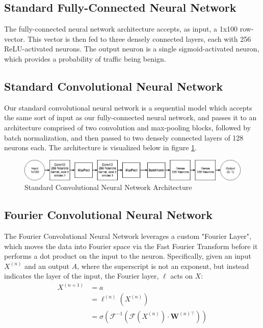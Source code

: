 \documentclass[10pt]{article}
\begin{document}
\subsection{Standard Fully-Connected Neural Network}
The fully-connected neural network architecture accepts, as input, a 1x100 row-vector. 
This vector is then fed to three densely connected layers, each with 256 ReLU-activated neurons.
The output neuron is a single sigmoid-activated neuron, which provides a probability of traffic being benign.

\subsection{Standard Convolutional Neural Network}
Our standard convolutional neural network is a sequential model which accepts the same sort of input as our fully-connected neural network, and passes it to an architecture comprised of two convolution and max-pooling blocks, followed by batch normalization, and then passed to two densely connected layers of 128 neurons each. The architecture is visualized below in figure \ref{fig:conv net}.

\begin{figure}[ht]
\caption{Standard Convolutional Neural Network Architecture}
\label{fig:conv net}
\includegraphics[width=\textwidth]{conv_architecture}
\centering
\end{figure}

\subsection{Fourier Convolutional Neural Network}
The Fourier Convolutional Neural Network leverages a custom "Fourier Layer", which moves the data into Fourier space via the Fast Fourier Transform before it performs a dot product on the input to the neuron.
Specifically, given an input $X^{(n)}$ and an output $A$, where the superscript is not an exponent, but instead indicates the layer of the input, the Fourier layer, $\ell$ acts on $X$: 
\begin{align*}
X^{(n+1)} & = a \\
& = \ell^{(n)}(X^{(n)}) \\
& = \sigma(\mathcal{F}^{-1}(\mathcal{F}(X^{(n)})\cdot \mathbf{W}^{(n)\top}))
\end{align*}
\end{document}
